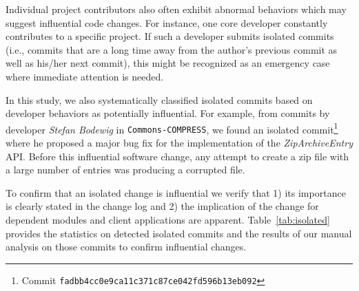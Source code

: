 
Individual project contributors also often exhibit abnormal
behaviors which may suggest influential code changes.
For instance, one core developer constantly contributes
 to a specific project. If such a developer
submits isolated commits (i.e., commits that are a long time away from
the author's previous commit as well as his/her next commit), this
might be recognized as an emergency case where immediate attention is needed. 

In this study, we also systematically classified isolated commits based on
developer behaviors as potentially influential. For example, from commits by
developer {\it Stefan Bodewig} in {\tt Commons-COMPRESS}, we found an isolated
commit\footnote{Commit \tt\small fadbb4cc0e9ca11c371c87ce042fd596b13eb092}
where he proposed a major bug fix for the implementation of the {\em
ZipArchiveEntry} API. Before this influential software change, any attempt to create a
zip file with a large number of entries was producing a corrupted file.





To confirm that an isolated change is influential we verify that 1) its importance is clearly stated in the change log and
2) the implication of the change for dependent modules and client applications are apparent.
Table~\ref{tab:isolated} provides the statistics on detected isolated commits
and the results of our manual analysis on those  commits to confirm influential changes.


